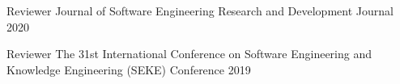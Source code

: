 

\begin{cventries}

\cventry
	{Reviewer} %
	{Journal of Software Engineering Research and Development} %
	{Journal} %
	{2020} %
	{}

\cventry
	{Reviewer} %
	{The 31st International Conference on Software Engineering and Knowledge Engineering (SEKE)} %
	{Conference} %
	{2019} %
	{}

\end{cventries}
